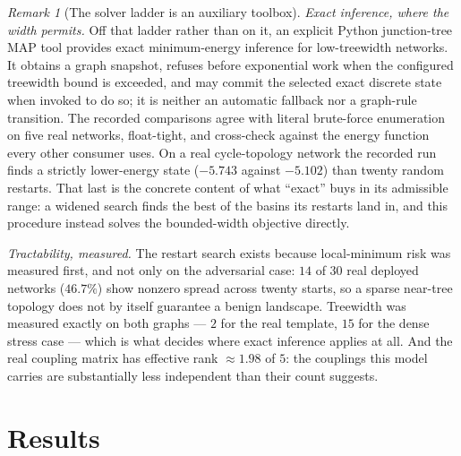 \documentclass[11pt,a4paper]{article}
\theoremstyle{remark}
\newtheorem{remark}[definition]{Remark}
\begin{document}
\begin{remark}[The solver ladder is an auxiliary toolbox]
\emph{Exact inference, where the width permits.} Off that ladder rather than on it, an explicit
Python junction-tree MAP tool provides exact minimum-energy inference for low-treewidth networks. It
obtains a graph snapshot, refuses before exponential work when the configured treewidth bound is
exceeded, and may commit the selected exact discrete state when invoked to do so; it is neither an
automatic fallback nor a graph-rule transition. The recorded comparisons agree with literal brute-force
enumeration on five real networks, float-tight, and cross-check against the energy function every
other consumer uses. On a real cycle-topology network the recorded run finds a strictly lower-energy
state ($-5.743$ against $-5.102$) than twenty random restarts. That last is the concrete content of
what ``exact'' buys in its admissible range: a widened search finds the best of the basins its restarts
land in, and this procedure instead solves the bounded-width objective directly.

\emph{Tractability, measured.} The restart search exists because local-minimum risk was measured
first, and not only on the adversarial case: $14$ of $30$ real deployed networks ($46.7\%$) show
nonzero spread across twenty starts, so a sparse near-tree topology does not by itself guarantee a
benign landscape. Treewidth was measured exactly on both graphs --- $2$ for the real template, $15$
for the dense stress case --- which is what decides where exact inference applies at all. And the real
coupling matrix has effective rank $\approx 1.98$ of $5$: the couplings this model carries are
substantially less independent than their count suggests.
\end{remark}

\section{Results}\label{sec:results}
\end{document}
